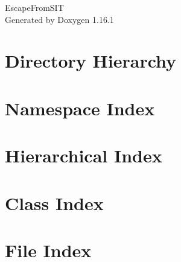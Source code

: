 \documentclass[twoside]{book}
\newcommand{\+}{\discretionary{\mbox{\scriptsize$\hookleftarrow$}}{}{}}
\newcommand{\clearemptydoublepage}{%
    \newpage{\pagestyle{empty}\cleardoublepage}%
  }
\begin{document}
  \raggedbottom
    \hypersetup{pageanchor=false,
                bookmarksnumbered=true,
                pdfencoding=unicode
               }
  \begin{titlepage}
  \vspace*{7cm}
  \begin{center}%
  {\Large Escape\+From\+SIT}\\
  \vspace*{1cm}
  {\large Generated by Doxygen 1.16.1}\\
  \end{center}
  \end{titlepage}
  \clearemptydoublepage
  \tableofcontents
  \clearemptydoublepage
  \hypersetup{pageanchor=true}
\chapter{Directory Hierarchy}

\chapter{Namespace Index}

\chapter{Hierarchical Index}

\chapter{Class Index}

\chapter{File Index}

\end{document}
